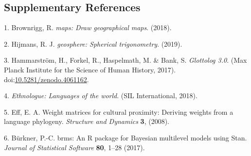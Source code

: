 \begin{appendix}
\newpage

\hypertarget{supplementary-references}{%
\subsection*{Supplementary References}\label{supplementary-references}}

\hypertarget{refs}{}
\leavevmode\hypertarget{ref-Brownrigg2018}{}%
1. Brownrigg, R. \emph{maps: Draw geographical maps}. (2018).

\leavevmode\hypertarget{ref-Hijmans2019}{}%
2. Hijmans, R. J. \emph{geosphere: Spherical trigonometry}. (2019).

\leavevmode\hypertarget{ref-Glottolog}{}%
3. Hammarström, H., Forkel, R., Haspelmath, M. \& Bank, S.
\emph{Glottolog 3.0}. (Max Planck Institute for the Science of Human
History, 2017).
doi:\href{https://doi.org/10.5281/zenodo.4061162}{10.5281/zenodo.4061162}.

\leavevmode\hypertarget{ref-Ethnologue}{}%
4. \emph{Ethnologue: Languages of the world}. (SIL International, 2018).

\leavevmode\hypertarget{ref-Eff2008}{}%
5. Eff, E. A. Weight matrices for cultural proximity: Deriving weights
from a language phylogeny. \emph{Structure and Dynamics} \textbf{3},
(2008).

\leavevmode\hypertarget{ref-Burkner2017}{}%
6. Bürkner, P.-C. brms: An R package for Bayesian multilevel models
using Stan. \emph{Journal of Statistical Software} \textbf{80}, 1--28
(2017).
\end{appendix}
